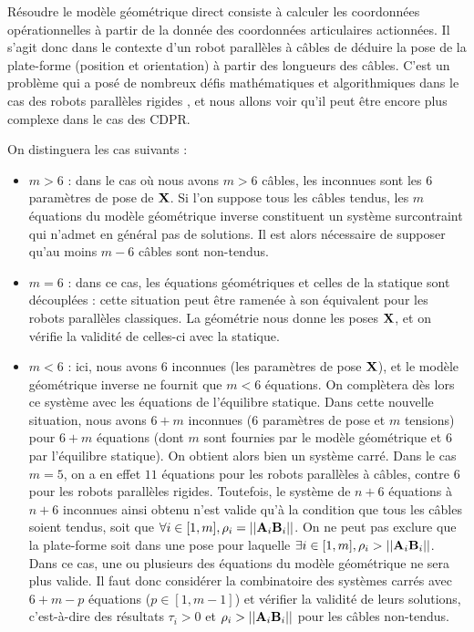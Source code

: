 Résoudre le modèle géométrique direct consiste à calculer les coordonnées 
opéra\-tionnelles à partir de la donnée des coordonnées articulaires 
actionn\'ees. Il s'agit donc dans le contexte d'un robot parallèles à câbles de 
déduire la pose de la plate-forme (position et orientation) à partir des 
longueurs des câbles. C'est un problème qui a posé de nombreux défis 
mathématiques et algorithmiques dans le cas des robots parallèles rigides 
\cite{merlet1997robots}, et nous allons voir qu'il peut \^etre encore plus 
complexe dans le cas des CDPR.

On distinguera les cas suivants :
\begin{itemize}
  \item $m > 6$ : dans le cas o\`u nous avons $m > 6$ c\^ables, les inconnues 
sont les $6$ param\`etres de pose de $\bf X$. Si l'on suppose tous les c\^ables 
tendus, les $m$ \'equations du mod\`ele g\'eom\'etrique inverse constituent un 
syst\`eme surcontraint qui n'admet en g\'en\'eral pas de solutions. Il est 
alors n\'ecessaire de supposer qu'au moins $m-6$ c\^ables sont non-tendus.
  \item $m = 6$ : dans ce cas, les \'equations g\'eom\'etriques et celles de la 
statique sont d\'ecoupl\'ees : cette situation peut \^etre ramen\'ee \`a son 
\'equivalent pour les robots parall\`eles classiques. La g\'eom\'etrie 
nous donne les poses $\bf X$, et on v\'erifie la validit\'e de celles-ci avec 
la statique.
  \item $m < 6$ : ici, nous avons $6$ inconnues (les param\`etres de 
pose $\bf X$), et le mod\`ele g\'eom\'etrique inverse ne fournit que $m < 6$ 
\'equations. On compl\`etera d\`es lors ce syst\`eme avec les \'equations de 
l'\'equilibre statique. Dans cette nouvelle situation, nous avons $6 + m$ 
inconnues ($6$ param\`etres de pose et $m$ tensions) pour $6 + m$ \'equations 
(dont $m$ sont fournies par le mod\`ele g\'eom\'etrique et $6$ par l'\'equilibre 
statique). On obtient alors bien un syst\`eme carr\'e. Dans le cas 
$m = 5$, on a en effet $11$ \'equations pour les robots parall\`eles \`a 
c\^ables, contre $6$ pour les robots parall\`eles rigides. Toutefois, le 
syst\`eme de $n+6$ \'equations \`a $n+6$ inconnues ainsi obtenu n'est valide 
qu'\`a la condition que tous les c\^ables soient tendus, soit que $\forall i 
\in [1,m], \rho_i = ||{\bf A}_i{\bf B}_i||$. On ne peut pas exclure que la 
plate-forme soit dans une pose pour la\-quelle $\exists i \in [1,m], \rho_i > 
||{\bf A}_i{\bf B}_i||$. Dans ce cas, une ou plusieurs des \'equations du 
mod\`ele g\'eom\'etrique ne sera plus valide. Il faut donc consid\'erer la 
combinatoire des syst\`emes carr\'es avec $6+m-p$ \'equations ($p \in [1, 
m-1]$) et v\'erifier la validit\'e de leurs solutions, c'est-\`a-dire des 
r\'esultats $\tau_i > 0$ et $\rho_i > ||{\bf A}_i{\bf B}_i||$ pour les 
c\^ables non-tendus. 
\end{itemize}


